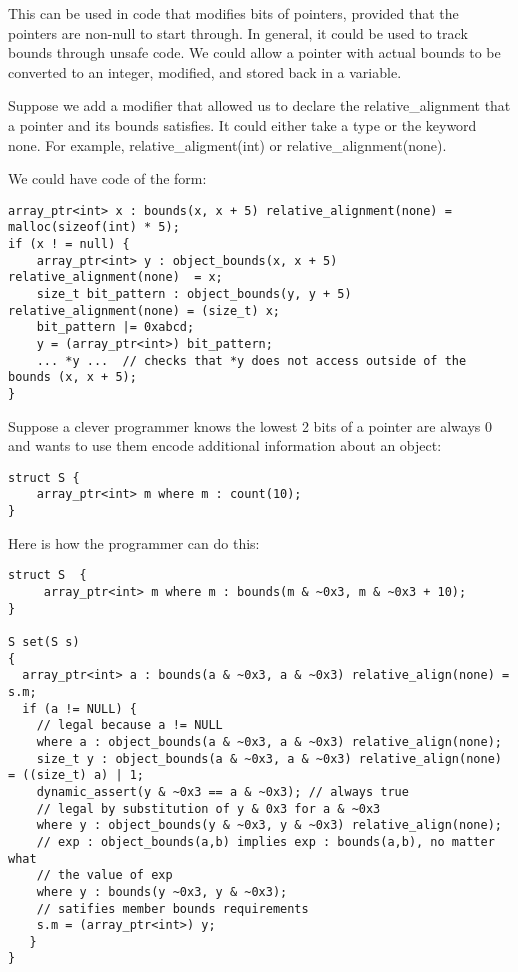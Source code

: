 This can be used in code that modifies bits of pointers, provided that
the pointers are non-null to start through. In general, it could be used
to track bounds through unsafe code. We could allow a pointer with
actual bounds to be converted to an integer, modified, and stored back
in a variable.

Suppose we add a modifier that allowed us to declare the
relative\_alignment that a pointer and its bounds satisfies. It could
either take a type or the keyword none. For example,
relative\_aligment(int) or relative\_alignment(none).

We could have code of the form:

\begin{verbatim}
array_ptr<int> x : bounds(x, x + 5) relative_alignment(none) = malloc(sizeof(int) * 5);
if (x ! = null) {
    array_ptr<int> y : object_bounds(x, x + 5) relative_alignment(none)  = x;
    size_t bit_pattern : object_bounds(y, y + 5) relative_alignment(none) = (size_t) x;
    bit_pattern |= 0xabcd;
    y = (array_ptr<int>) bit_pattern;
    ... *y ...  // checks that *y does not access outside of the bounds (x, x + 5);
}
\end{verbatim}

Suppose a clever programmer knows the lowest 2 bits of a pointer are
always 0 and wants to use them encode additional information about an
object:
\begin{verbatim}
struct S {
    array_ptr<int> m where m : count(10);
}
\end{verbatim}

Here is how the programmer can do this:
\begin{verbatim}
struct S  {
     array_ptr<int> m where m : bounds(m & ~0x3, m & ~0x3 + 10);
}

S set(S s) 
{
  array_ptr<int> a : bounds(a & ~0x3, a & ~0x3) relative_align(none) = s.m;
  if (a != NULL) {
    // legal because a != NULL
    where a : object_bounds(a & ~0x3, a & ~0x3) relative_align(none);
    size_t y : object_bounds(a & ~0x3, a & ~0x3) relative_align(none) = ((size_t) a) | 1;
    dynamic_assert(y & ~0x3 == a & ~0x3); // always true
    // legal by substitution of y & 0x3 for a & ~0x3
    where y : object_bounds(y & ~0x3, y & ~0x3) relative_align(none);
    // exp : object_bounds(a,b) implies exp : bounds(a,b), no matter what
    // the value of exp
    where y : bounds(y ~0x3, y & ~0x3);
    // satifies member bounds requirements
    s.m = (array_ptr<int>) y;
   }
}
\end{verbatim}

